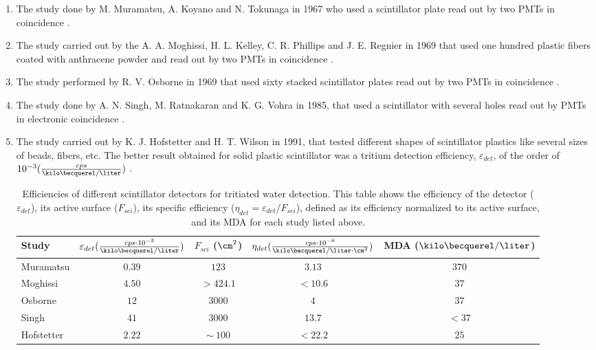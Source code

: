 \begin{enumerate}

\item{} The study done by M. Muramatsu, A. Koyano and N. Tokunaga in 1967 who used a scintillator plate read out by two PMTs in coincidence \cite{Muramatsu}.

\item{} The study carried out by the A. A. Moghissi, H. L. Kelley, C. R. Phillips and J. E. Regnier in 1969 that used one hundred plastic fibers coated with anthracene powder and read out by two PMTs in coincidence \cite{Moghissi}.

\item{} The study performed by R. V. Osborne in 1969 that used sixty stacked scintillator plates read out by two PMTs in coincidence \cite{Osborne}.

\item{} The study done by A. N. Singh, M. Ratnakaran and K. G. Vohra in 1985, that used a scintillator with several holes read out by PMTs in electronic coincidence \cite{Ratnakaran, Ratnakaran2000}.

\item{} The study carried out by K. J. Hofstetter and H. T. Wilson in 1991, that tested different shapes of scintillator plastics like several sizes of beads, fibers, etc. The better result obtained for solid plastic scintillator was a tritium detection efficiency, $\varepsilon_{det}$, of the order of $10^{-3}(\frac{cps}{\kilo\becquerel/\liter})$ \cite{Hofstetter1, Hofstetter2}.

\begin{table}[htbp]
\centering{}%
\begin{tabular}{lcccc}
\toprule 
Study & \parbox{5.5em}{$\varepsilon_{det}(\frac{cps \cdot{} 10^{-3}}{\kilo\becquerel/\liter})$}  & \parbox{4.5em}{$F_{sci}$ ($\cm^2$)}  & \parbox{6.5em}{$\eta_{det}(\frac{cps \cdot{} 10^{-6}}{\kilo\becquerel/ \liter \cdot{} \cm^2})$} & MDA ($\kilo\becquerel / \liter$) \tabularnewline
\midrule
\midrule 
Muramatsu & $0.39$ & $123$ & $3.13$ & $370$ \tabularnewline
Moghissi & $4.50$ & $>424.1$ & $<10.6$ & $37$ \tabularnewline
Osborne & $12$ & $3000$ & $4$ & $37$ \tabularnewline
Singh & $41$ & $3000$ & $13.7$ & $<37$ \tabularnewline
Hofstetter & $2.22$ & $\sim~100$ & $<22.2$ & $25$ \tabularnewline
\bottomrule
\end{tabular}
\caption{Efficiencies of different scintillator detectors for tritiated water detection. This table shows the efficiency of the detector ($\varepsilon_{det}$), its active surface ($F_{sci}$), its specific efficiency ($\eta_{det}=\varepsilon_{det}/F_{sci}$), defined as its efficiency normalized to its active surface, and its MDA for each study listed above.}
\label{tab:PlasticScinTritium}
\end{table}

\end{enumerate}

